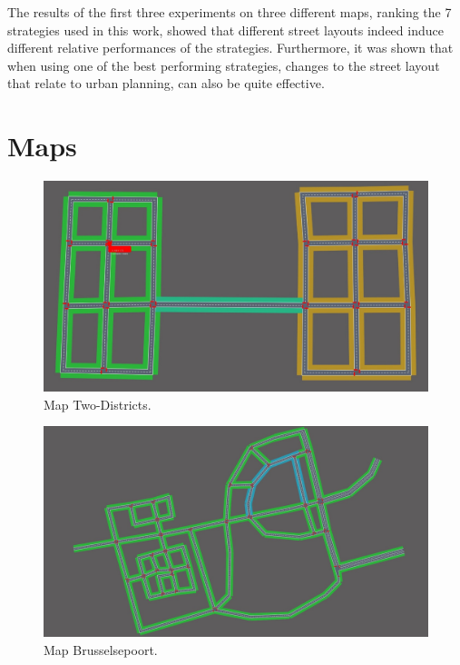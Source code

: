 \documentclass[11pt]{article}
\begin{document}
The results of the first three experiments on three different maps, ranking the 7 strategies used in this work, showed that different street layouts indeed induce different relative performances of the strategies. Furthermore, it was shown that when using one of the best performing strategies, changes to the street layout that relate to urban planning, can also be quite effective.

{\tiny\printbibliography}

\clearpage
\raggedbottom
\appendix

\section{Maps}
\begin{figure}[h]
	\includegraphics[width=\linewidth]{img/twodistr.jpeg}
	\caption{Map Two-Districts.}
\end{figure}

\begin{figure}[h]
	\includegraphics[width=\linewidth]{img/maas.jpeg}
	\caption{Map Brusselsepoort.}
\end{figure}
\end{document}
